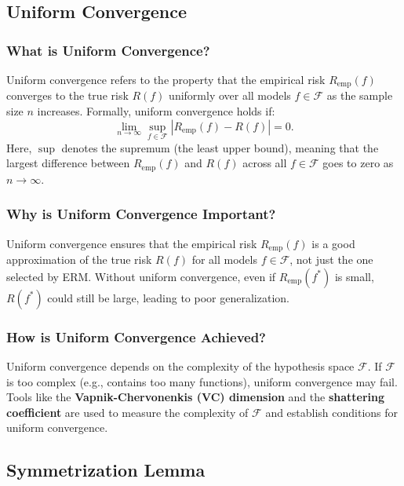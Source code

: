 \begin{notechapter}
\subsection{Uniform Convergence}

\subsubsection{What is Uniform Convergence?}
Uniform convergence refers to the property that the empirical risk \( R_{\text{emp}}(f) \) converges to the true risk \( R(f) \) uniformly over all models \( f \in \mathcal{F} \) as the sample size \( n \) increases. Formally, uniform convergence holds if:
\[
\lim_{n \to \infty} \sup_{f \in \mathcal{F}} |R_{\text{emp}}(f) - R(f)| = 0.
\]
Here, \( \sup \) denotes the supremum (the least upper bound), meaning that the largest difference between \( R_{\text{emp}}(f) \) and \( R(f) \) across all \( f \in \mathcal{F} \) goes to zero as \( n \to \infty \).

\subsubsection{Why is Uniform Convergence Important?}
Uniform convergence ensures that the empirical risk \( R_{\text{emp}}(f) \) is a good approximation of the true risk \( R(f) \) for all models \( f \in \mathcal{F} \), not just the one selected by ERM. Without uniform convergence, even if \( R_{\text{emp}}(f^*) \) is small, \( R(f^*) \) could still be large, leading to poor generalization.

\subsubsection{How is Uniform Convergence Achieved?}
Uniform convergence depends on the complexity of the hypothesis space \( \mathcal{F} \). If \( \mathcal{F} \) is too complex (e.g., contains too many functions), uniform convergence may fail. Tools like the \textbf{Vapnik-Chervonenkis (VC) dimension} and the \textbf{shattering coefficient} are used to measure the complexity of \( \mathcal{F} \) and establish conditions for uniform convergence.

\subsection{Symmetrization Lemma}


\end{notechapter}
